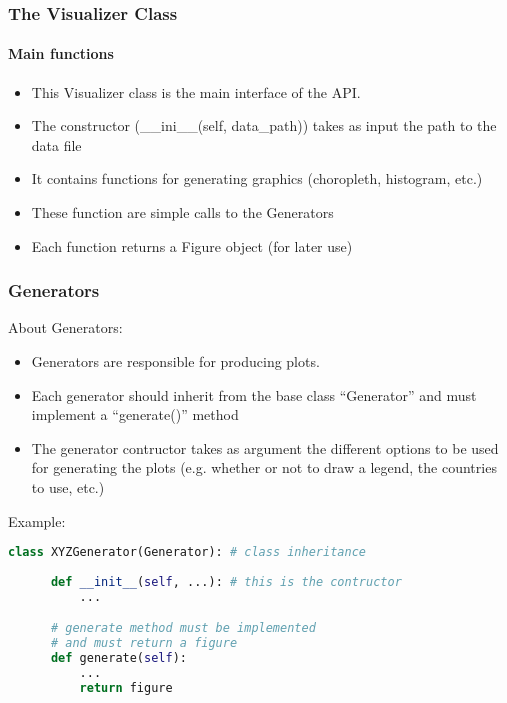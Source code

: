 \begin{frame}
  \frametitle{The Visualizer Class}
  \framesubtitle{Main functions}

  \begin{itemize}
    \item This Visualizer class is the main interface of the API.
    \item The constructor (\_\_ini\_\_(self, data\_path)) takes as input 
      the path to the data file
    \item It contains functions for generating graphics (choropleth, histogram, etc.)
    \item These function are simple calls to the Generators
    \item Each function returns a Figure object (for later use)
  \end{itemize}

\end{frame}

\begin{frame}[fragile,shrink=30]
  \frametitle{Generators}

  About Generators:
  \begin{itemize}
    \item Generators are responsible for producing plots.
    \item Each generator should inherit from the base class 
      ``Generator'' and must implement a ``generate()'' method
    \item The generator contructor takes as argument the different options 
      to be used for generating the plots 
      (e.g. whether or not to draw a legend, the countries to use, etc.)
  \end{itemize}

  \vspace{5mm}

  Example:
  \begin{lstlisting}[language=Python]
  class XYZGenerator(Generator): # class inheritance
      
      def __init__(self, ...): # this is the contructor
          ...

      # generate method must be implemented 
      # and must return a figure
      def generate(self): 
          ...
          return figure
  \end{lstlisting}
\end{frame}

